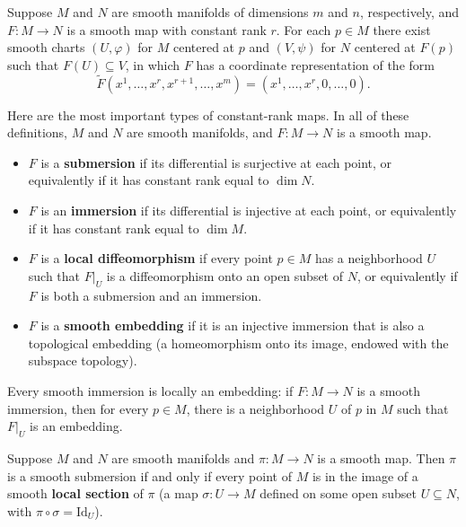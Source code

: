 \begin{theorem}
\label{thm:rank-theorem}
Suppose $M$ and $N$ are smooth manifolds of dimensions $m$ and $n$, respectively, and $F: M \to N$ is a smooth map with constant rank $r$. For each $p \in M$ there exist smooth charts $(U, \varphi)$ for $M$ centered at $p$ and $(V, \psi)$ for $N$ centered at $F(p)$ such that $F(U) \subseteq V$, in which $F$ has a coordinate representation of the form
\begin{equation}
\tilde{F}(x^1, \ldots, x^r, x^{r+1}, \ldots, x^m) = (x^1, \ldots, x^r, 0, \ldots, 0). \tag{A.5}
\end{equation}
\end{theorem}

Here are the most important types of constant-rank maps. In all of these definitions, $M$ and $N$ are smooth manifolds, and $F: M \to N$ is a smooth map.

\begin{itemize}
\item $F$ is a \textbf{submersion} if its differential is surjective at each point, or equivalently if it has constant rank equal to $\dim N$.
\item $F$ is an \textbf{immersion} if its differential is injective at each point, or equivalently if it has constant rank equal to $\dim M$.
\item $F$ is a \textbf{local diffeomorphism} if every point $p \in M$ has a neighborhood $U$ such that $F|_U$ is a diffeomorphism onto an open subset of $N$, or equivalently if $F$ is both a submersion and an immersion.
\item $F$ is a \textbf{smooth embedding} if it is an injective immersion that is also a topological embedding (a homeomorphism onto its image, endowed with the subspace topology).
\end{itemize}

\begin{theorem}
\label{thm:local-embedding-theorem}
Every smooth immersion is locally an embedding: if $F: M \to N$ is a smooth immersion, then for every $p \in M$, there is a neighborhood $U$ of $p$ in $M$ such that $F|_U$ is an embedding.
\end{theorem}

\begin{theorem}
\label{thm:local-section-theorem}
Suppose $M$ and $N$ are smooth manifolds and $\pi: M \to N$ is a smooth map. Then $\pi$ is a smooth submersion if and only if every point of $M$ is in the image of a smooth \textbf{local section} of $\pi$ (a map $\sigma: U \to M$ defined on some open subset $U \subseteq N$, with $\pi \circ \sigma = \text{Id}_U$).
\end{theorem}

